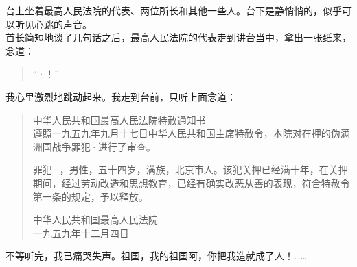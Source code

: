 台上坐着最高人民法院的代表、两位所长和其他一些人。台下是静悄悄的，似乎可以听见心跳的声音。\\

首长简短地谈了几句话之后，最高人民法院的代表走到讲台当中，拿出一张纸来，念道：\\

\begin{quote}
	“·！”\\
\end{quote}

我心里激烈地跳动起来。我走到台前，只听上面念道：\\

\begin{quote}
	中华人民共和国最高人民法院特赦通知书\\

遵照一九五九年九月十七日中华人民共和国主席特赦令，本院对在押的伪满洲国战争罪犯·进行了审查。

罪犯·，男性，五十四岁，满族，北京市人。该犯关押已经满十年，在关押期问，经过劳动改造和思想教育，已经有确实改恶从善的表现，符合特赦令第一条的规定，予以释放。\\

\begin{flushright}
	中华人民共和国最高人民法院\\

一九五九年十二月四日\\
\end{flushright}
\end{quote}

不等听完，我已痛哭失声。祖国，我的祖国阿，你把我造就成了人！……